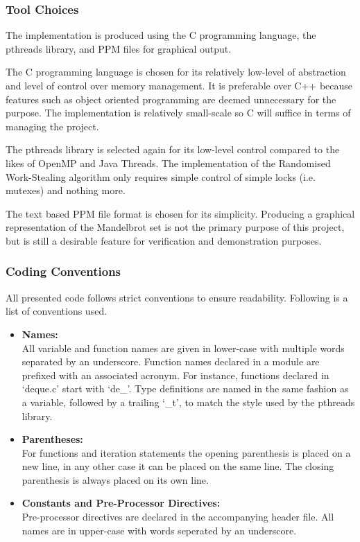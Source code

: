 \subsubsection*{Tool Choices}

The implementation is produced using the C programming language, the pthreads library, and PPM files for graphical output.

The C programming language is chosen for its relatively low-level of abstraction and level of control over memory management.
It is preferable over C++ because features such as object oriented programming are deemed unnecessary for the purpose. 
The implementation is relatively small-scale so C will suffice in terms of managing the project.

The pthreads library is selected again for its low-level control compared to the likes of OpenMP and Java Threads.
The implementation of the Randomised Work-Stealing algorithm only requires simple control of simple locks (i.e. mutexes)
and nothing more. 

The text based PPM file format is chosen for its simplicity. Producing a graphical representation of the Mandelbrot set is not
the primary purpose of this project, but is still a desirable feature for verification and demonstration purposes.


\subsubsection*{Coding Conventions}

All presented code follows strict conventions to ensure readability. Following is a list of conventions used.
\begin{itemize}
\item \textbf{Names: } \\
            All variable and function names are given in lower-case with multiple words separated by an underscore.
            Function names declared in a module are prefixed with an associated acronym. For instance, functions declared in 
            `deque.c' start with `de\_'.
            Type definitions are named in the same fashion as a variable, followed by a trailing `\_t', to match the style used 
            by the pthreads library.
            
\item \textbf{Parentheses: } \\
            For functions and iteration statements the opening parenthesis is placed on a new line, in any other case it
            can be placed on the same line. The closing parenthesis is always placed on its own line.
                        
\item \textbf{Constants and Pre-Processor Directives: } \\
            Pre-processor directives are declared in the accompanying header file. All names are in upper-case
            with words seperated by an underscore.
\end{itemize}

